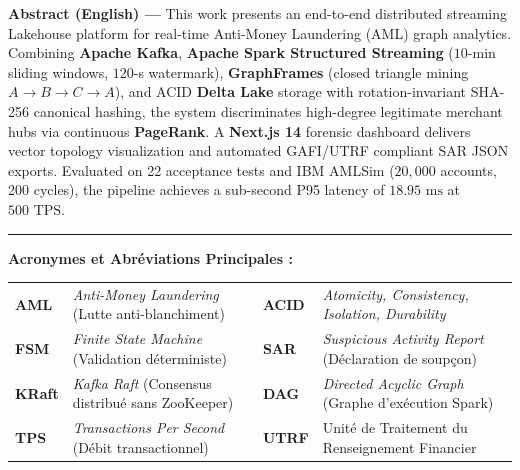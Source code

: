\vspace{0.25cm}
\noindent\textbf{\color{primaryNavy}Abstract (English) ---} This work presents an end-to-end distributed streaming Lakehouse platform for real-time Anti-Money Laundering (AML) graph analytics. Combining \textbf{Apache Kafka}, \textbf{Apache Spark Structured Streaming} ($10$-min sliding windows, $120$-s watermark), \textbf{GraphFrames} (closed triangle mining $A \to B \to C \to A$), and ACID \textbf{Delta Lake} storage with rotation-invariant SHA-256 canonical hashing, the system discriminates high-degree legitimate merchant hubs via continuous \textbf{PageRank}. A \textbf{Next.js 14} forensic dashboard delivers vector topology visualization and automated GAFI/UTRF compliant SAR JSON exports. Evaluated on 22 acceptance tests and IBM AMLSim ($20,000$ accounts, 200 cycles), the pipeline achieves a sub-second P95 latency of $18.95\text{ ms}$ at $500\text{ TPS}$.

\vspace{0.25cm}
\noindent\rule{\textwidth}{0.8pt}
\vspace{0.2cm}

\noindent\textbf{\color{primaryNavy}Acronymes et Abréviations Principales :}\\[0.15cm]
\footnotesize
\begin{tabularx}{\textwidth}{l X l X}
\toprule
\textbf{AML} & \textit{Anti-Money Laundering} (Lutte anti-blanchiment) & \textbf{ACID} & \textit{Atomicity, Consistency, Isolation, Durability} \\
\textbf{FSM} & \textit{Finite State Machine} (Validation déterministe) & \textbf{SAR} & \textit{Suspicious Activity Report} (Déclaration de soupçon) \\
\textbf{KRaft} & \textit{Kafka Raft} (Consensus distribué sans ZooKeeper) & \textbf{DAG} & \textit{Directed Acyclic Graph} (Graphe d'exécution Spark) \\
\textbf{TPS} & \textit{Transactions Per Second} (Débit transactionnel) & \textbf{UTRF} & Unité de Traitement du Renseignement Financier \\
\bottomrule
\end{tabularx}
